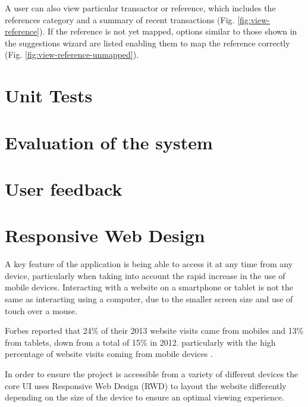 A user can also view particular transactor or reference, which includes the references category and a summary of recent transactions (Fig. \ref{fig:view-reference}). If the reference is not yet mapped, options similar to those shown in the suggestions wizard are listed enabling them to map the reference correctly (Fig. \ref{fig:view-reference-unmapped}). 

\section{Unit Tests}

\section{Evaluation of the system}


\section{User feedback}


\section[Responsive Design]{Responsive Web Design}

A key feature of the application is being able to access it at any time from any device, particularly when taking into account the rapid increase in the use of mobile devices.  Interacting with a website on a smartphone or tablet is not the same as interacting using a computer, due to the smaller screen size and use of touch over a mouse.

Forbes reported that 24\% of their 2013 website visits came from mobiles and 13\% from tablets, down from a total of 15\% in 2012. particularly with the high percentage of website visits coming from mobile devices \parencite{steimle2013responsive}.

In order to ensure the project is accessible from a variety of different devices the core UI uses Responsive Web Design (RWD) to layout the website differently depending on the size of the device to ensure an optimal viewing experience.

